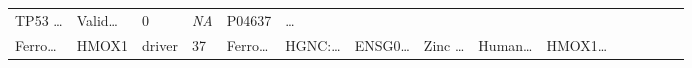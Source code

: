\documentclass[
]{article}
\begin{document}
\begin{longtable}[]{@{}lllllllllllllll@{}}
\begin{minipage}[t]{0.05\columnwidth}
TP53 \ldots{}\strut
\end{minipage} & \begin{minipage}[t]{0.05\columnwidth}\raggedright
Valid\ldots{}\strut
\end{minipage} & \begin{minipage}[t]{0.05\columnwidth}\raggedright
0\strut
\end{minipage} & \begin{minipage}[t]{0.05\columnwidth}\raggedright
\emph{NA}\strut
\end{minipage} & \begin{minipage}[t]{0.05\columnwidth}\raggedright
P04637\strut
\end{minipage} & \begin{minipage}[t]{0.02\columnwidth}\raggedright
\ldots{}\strut
\end{minipage}\tabularnewline
\begin{minipage}[t]{0.05\columnwidth}\raggedright
Ferro\ldots{}\strut
\end{minipage} & \begin{minipage}[t]{0.05\columnwidth}\raggedright
HMOX1\strut
\end{minipage} & \begin{minipage}[t]{0.04\columnwidth}\raggedright
driver\strut
\end{minipage} & \begin{minipage}[t]{0.02\columnwidth}\raggedright
37\strut
\end{minipage} & \begin{minipage}[t]{0.05\columnwidth}\raggedright
Ferro\ldots{}\strut
\end{minipage} & \begin{minipage}[t]{0.05\columnwidth}\raggedright
HGNC:\ldots{}\strut
\end{minipage} & \begin{minipage}[t]{0.05\columnwidth}\raggedright
ENSG0\ldots{}\strut
\end{minipage} & \begin{minipage}[t]{0.05\columnwidth}\raggedright
Zinc \ldots{}\strut
\end{minipage} & \begin{minipage}[t]{0.05\columnwidth}\raggedright
Human\ldots{}\strut
\end{minipage} & \begin{minipage}[t]{0.05\columnwidth}\raggedright
HMOX1\ldots{}\strut
\end{minipage} & \begin{minipage}[t]{0.05\columnwidth}\raggedright

\end{minipage}
\end{longtable}
\end{document}
